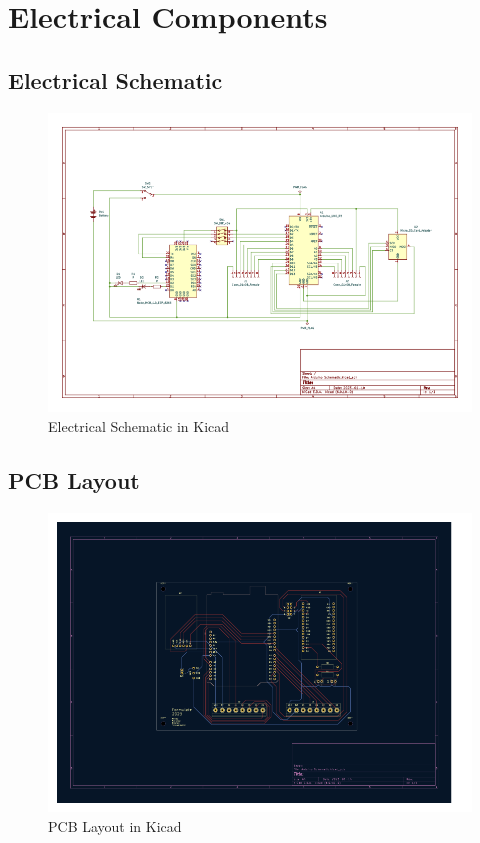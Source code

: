 \documentclass[12pt, titlepage]{article}
\begin{document}
\newpage
\section{Electrical Components}

\subsection{Electrical Schematic}
\begin{figure}[h!]
  \begin{center}
  \includegraphics[width=1.0\textwidth]{Electrical_Schematic}
  \caption{Electrical Schematic in Kicad}
  \end{center}
  \end{figure}
  \newpage

\subsection{PCB Layout}
\begin{figure}[h!]
  \begin{center}
  \includegraphics[width=1.0\textwidth]{PCB_Schematic}
  \caption{PCB Layout in Kicad}
  \end{center}
  \end{figure}
  \newpage
\end{document}
